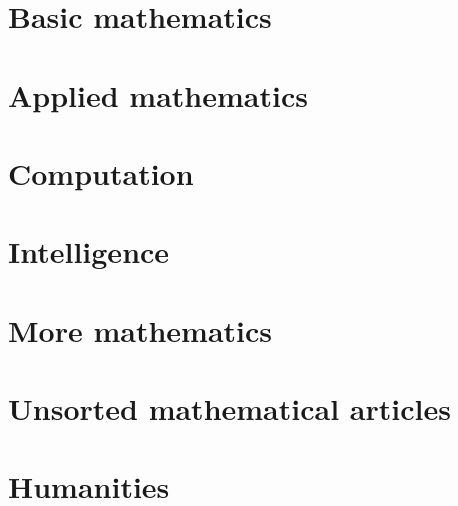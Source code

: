 \documentclass[10pt,book,openany]{memoir}
\begin{document}
\setlength\abovedisplayskip{0em}
\setlength\belowdisplayskip{0em}
\setlength\abovedisplayshortskip{0em}
\setlength\belowdisplayshortskip{0em}
\frontmatter

\newpage

\newpage

\newpage
{%
\setlength\cftbeforepartskip{1em}%
\setlength\cftbeforechapterskip{0em}%
\renewcommand{\contentsname}{Chapters}%
\renewcommand{\cftpartfont}{\normalsize\bfseries}%
\renewcommand{\cftchapterfont}{\normalsize}%
\renewcommand{\cftchapterpagefont}{\normalsize}%
\setcounter{tocdepth}{0}%
\tableofcontents%
\clearpage%
}%
{\setcounter{tocdepth}{3}%
\newpage%
\tableofcontents%
}
\mainmatter
\part{Basic mathematics}









\part{Applied mathematics}




\part{Computation}




\part{Intelligence}










\part{More mathematics}






\part{Unsorted mathematical articles}


\part{Humanities}




\end{document}
